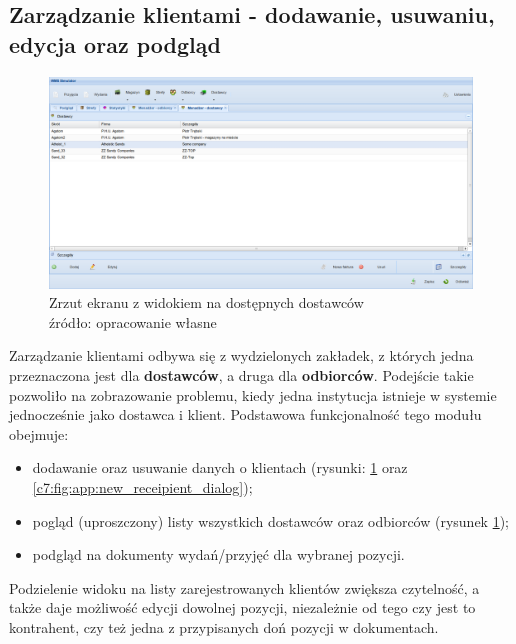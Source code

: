	\subsection{Zarządzanie klientami - dodawanie, usuwaniu, edycja oraz podgląd}
		\begin{figure}[H]
			\centering
			\includegraphics[width=1.1\textwidth]{images/app/supplier_preview}
			\caption[Aplikacja - Dostęp do danych klientów]{
				Zrzut ekranu z widokiem na dostępnych dostawców \\
				źródło: opracowanie własne
			}
			\label{c7:fig:app:supplier_preview}
		\end{figure}
	
		Zarządzanie klientami odbywa się z wydzielonych zakładek, z których jedna przeznaczona jest
		dla \textbf{dostawców}, a druga dla \textbf{odbiorców}. Podejście takie pozwoliło na zobrazowanie problemu,
		kiedy jedna instytucja istnieje w systemie jednocześnie jako dostawca i klient. Podstawowa funkcjonalność tego
		modułu obejmuje:
		\begin{itemize}
			\item dodawanie oraz usuwanie danych o klientach (rysunki: \ref{c7:fig:app:supplier_preview} oraz \ref{c7:fig:app:new_receipient_dialog});
			\item pogląd (uproszczony) listy wszystkich dostawców oraz odbiorców (rysunek \ref{c7:fig:app:supplier_preview});
			\item podgląd na dokumenty wydań/przyjęć dla wybranej pozycji.
		\end{itemize}
		Podzielenie widoku na listy zarejestrowanych klientów zwiększa czytelność, a także daje możliwość edycji dowolnej pozycji,
		niezależnie od tego czy jest to kontrahent, czy też jedna z przypisanych doń pozycji w dokumentach.	
	

